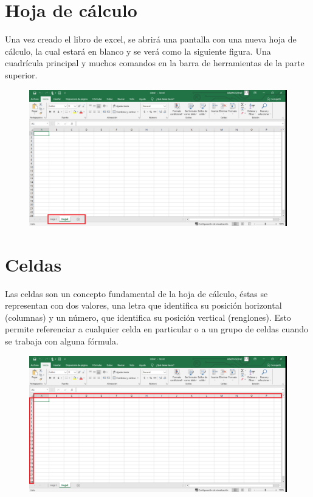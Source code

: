 \documentclass[12pt,a4paper]{book}
\begin{document}
\section{Hoja de cálculo}
Una vez creado el libro de excel, se abrirá una pantalla con una nueva hoja de cálculo, la cual estará en blanco y se verá como la siguiente figura. Una cuadrícula principal y muchos comandos en la barra de herramientas de la parte superior. 
\begin{figure}[h]
	\centering
    \includegraphics[width=13cm]{excel3}
\end{figure}
\section{Celdas}
Las celdas son un concepto fundamental de la hoja de cálculo, éstas se representan con dos valores, una letra que identifica su posición horizontal (columnas) y un número, que identifica su posición vertical (renglones). Esto permite referenciar a cualquier celda en particular o a un grupo de celdas cuando se trabaja con alguna fórmula.   
\begin{figure}[h]
    \centering
    \includegraphics[width=12cm]{excel4}
\end{figure}
\clearpage
\end{document}

